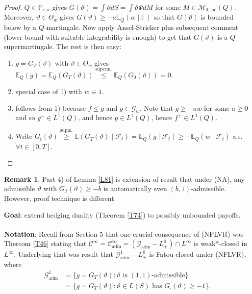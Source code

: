\documentclass[12pt,a4paper, twoside]{article}
\theoremstyle{definition}
\newtheorem{rem}{Remark}[section]
\newcommand{\EE}{\mathbb{E}} %
\newcommand{\PP}{\mathbb{P}} %
\begin{document}
\begin{proof}
$Q \in \PP_{e,  \sigma}$ gives $G( \vartheta) = \int \vartheta dS = \int  \vartheta \Psi dM$ for some $M \in \mathcal{M}_{0, \text{loc}}(Q)$. Moreover, $\vartheta \in \Theta_w$ gives $G( \vartheta) \geq -a \EE_Q(w \mid \mathbb{F})$ so that $G( \vartheta)$ is bounded below by a $Q$-martingale. Now apply Ansel-Stricker plus subsequent comment (lower bound with suitable integrability is enough) to get that $G( \vartheta)$ is a $Q$-supermartingale. The rest is then easy: 
\begin{enumerate}
\item $g= G_T( \vartheta)$ with $\vartheta \in \Theta_w$ gives $\EE_Q(g) = \EE_Q(G_T( \vartheta)) \overset{\text{superm.}}\leq \EE_Q( G_0( \vartheta))=0.$
\item special case of 1) with $w \equiv 1$. 
\item follows from 1) because $f \leq g$ and $g \in \mathcal{G}_w$. Note that $g \geq -aw$ for some $a \geq 0$ and so $g^- \in L^1(Q)$, and hence $g \in L^1(Q)$, hence $f^+ \in L^1(Q)$. 
\item Write $G_t( \vartheta) \overset{\text{supm.}}\geq  \EE(G_T( \vartheta) \mid \mathcal{F}_t) = \EE_Q(g \mid \mathcal{F}_t) \geq - \EE_Q( \widetilde{w} \mid \mathcal{F}_t)$ a.s. $\forall t \in [0,T]$. 
\end{enumerate} 
\end{proof}
\newpage
\begin{rem} Part 4) of Lemma \ref{L81} is extension of result that under (NA), any admissible $\vartheta$ with $G_T( \vartheta)  \geq -b$ is automatically even $(b,1)$-admissible. However, proof technique is different. 
\end{rem}
\noindent \textbf{Goal}: extend hedging duality (Theorem \ref{T74}) to possibly unbounded payoffs. 
\\\\
\textbf{Notation}: Recall from Section 5 that one crucial consequence of (NFLVR) was Thereom \ref{T46} stating that $\mathcal{C}^\infty = \mathcal{C}_\text{adm}^\infty = ( \mathcal{G}_\text{adm}- L_+^0) \cap L^\infty$ is weak*-closed in $L^\infty$. Underlying that was result that $\mathcal{G}_\text{adm}^1 - L_+^0$ is Fatou-closed under (NFLVR), where 
\begin{align*}
\mathcal{G}_\text{adm}^1&= \{ g = G_T( \vartheta): \vartheta \text{ is $(1,1)$-admissible}\} \\
&= \{ g = G_T( \vartheta): \vartheta \in L(S) \text{ has } G_\cdot( \vartheta) \geq -1 \}. 
\end{align*}
\end{document}
